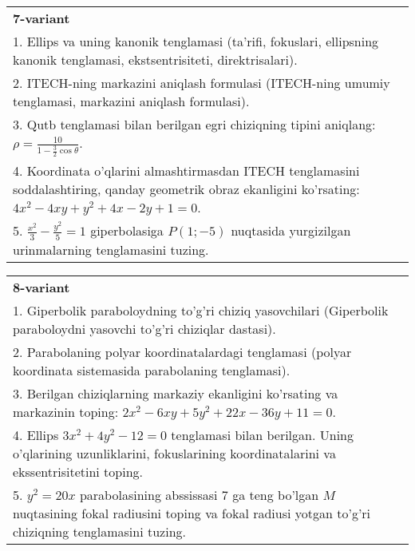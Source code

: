 \documentclass{article}
\begin{document}
\begin{tabular}{m{17cm}}
\textbf{7-variant}\\
1. Ellips va uning kanonik tenglamasi (ta'rifi, fokuslari, ellipsning kanonik tenglamasi, ekstsentrisiteti, direktrisalari).\\

2. ITECH-ning markazini aniqlash formulasi (ITECH-ning umumiy tenglamasi, markazini aniqlash formulasi).\\

3. Qutb tenglamasi bilan berilgan egri chiziqning tipini aniqlang: $\rho=\frac{10}{1-\frac{3}{2}\cos\theta}$.\\

4. Koordinata o'qlarini almashtirmasdan ITECH tenglamasini soddalashtiring, qanday geometrik obraz ekanligini ko'rsating: $4x^{2} - 4xy + y^{2} + 4x - 2y + 1 = 0$.  \\

5. $\frac{x^{2}}{3} - \frac{y^{2}}{5} = 1$ giperbolasiga $P(1; - 5)$ nuqtasida yurgizilgan urinmalarning tenglamasini tuzing.
\end{tabular}
\vspace{1cm}


\begin{tabular}{m{17cm}}
\textbf{8-variant}\\
1. Giperbolik paraboloydning to'g'ri chiziq yasovchilari (Giperbolik paraboloydni yasovchi to'g'ri chiziqlar dastasi).\\

2. Parabolaning polyar koordinatalardagi tenglamasi (polyar koordinata sistemasida parabolaning tenglamasi).\\

3. Berilgan chiziqlarning markaziy ekanligini ko'rsating va markazinin toping: $2x^{2}-6xy+5y^{2}+22x-36y+11=0$.\\

4. Ellips $3x^{2} + 4y^{2} - 12 = 0$ tenglamasi bilan berilgan. Uning o'qlarining uzunliklarini, fokuslarining koordinatalarini va ekssentrisitetini toping.  \\

5. $y^{2} = 20x$ parabolasining abssissasi 7 ga teng bo'lgan $M$ nuqtasining fokal radiusini toping va fokal radiusi yotgan to'g'ri chiziqning tenglamasini tuzing.  
\end{tabular}
\vspace{1cm}
\end{document}
